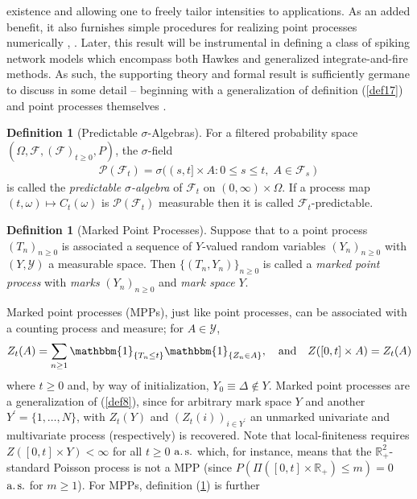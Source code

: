 \documentclass[12pt, oneside]{report}
\newcommand{\mbb}[1]{\mathbb{#1}}
\newcommand{\1}[1]{\mathbbm{1}_{\{#1\}}}
\newcommand{\mc}[1]{\mathcal{#1}}
\theoremstyle{definition}
\newtheorem{definition}[theorem]{Definition}
\begin{document}
existence and allowing one to freely tailor intensities to applications. As an
added benefit, it also furnishes simple procedures for realizing point processes
numerically \cite[algorithm 2]{Ogata_1981}, \cite{Mascart_Muzy_Reynaud-bouret_2021}.
Later, this result will be instrumental in defining a class of spiking network models which
encompass both Hawkes and generalized integrate-and-fire methods. As such, the
supporting theory and formal result is sufficiently germane to discuss in some
detail -- beginning with a generalization of definition (\ref{def17}) and point
processes themselves \cite[ch.8]{Bremaud_1981}.
\begin{definition}[Predictable $\sigma$-Algebras]\label{def18} For a filtered
    probability space $(\Omega,\mc{F},(\mc{F})_{t\geq 0},P)$, the $\sigma$-field
\begin{align}
    \mc{P}(\mc{F}_t)=\sigma((s,t]\times A:0\leq s\leq t,\;A\in\mc{F}_s)
\end{align}
is called the {\it predictable $\sigma$-algebra} of $\mc{F}_t$ on
$(0,\infty)\times\Omega$. If a process map $(t,\omega)\mapsto C_t(\omega)$ is
$\mc{P}(\mc{F}_t)$ measurable then it is called $\mc{F}_t$-predictable.
\end{definition}
\begin{definition}[Marked Point Processes]\label{def19} Suppose that to a point
    process $(T_n)_{n\geq 0}$ is associated a sequence of $Y$-valued random
    variables $(Y_n)_{n\geq 0}$ with $(Y,\mc{Y})$ a measurable space. Then
    $\{(T_n,Y_n)\}_{n\geq 0}$ is called a {\it marked point process} with {\it
    marks} $(Y_n)_{n\geq 0}$ and {\it mark space} $Y$.
\end{definition}
Marked point processes (MPPs), just like point processes, can be associated with
a counting process and measure; for $A\in\mc{Y}$,
\begin{align}
    Z_t(A)=\sum_{n\geq 1}\1{T_n\leq t}\1{Z_n\in A},\quad\text{and}\quad Z([0,t]\times A)=Z_t(A)
\end{align}
where $t\geq0$ and, by way of initialization, $Y_0\equiv\Delta\notin Y$. Marked
point processes are a generalization of (\ref{def8}), since for arbitrary mark
space $Y$ and another $Y^\prime=\{1,\dots,N\}$, with $Z_t(Y)$ and
$(Z_t(i))_{i\in Y^\prime}$ an unmarked univariate and multivariate process
(respectively) is recovered. Note that local-finiteness requires $Z([0,t]\times Y)<\infty$ for all $t\geq 0$ $\operatorname{a.s.}$ which,
for instance, means that the $\mbb{R}^2_+$-standard Poisson process is not a MPP (since $P(\Pi([0,t]\times\mbb{R}_+)\leq m)=0$ $\operatorname{a.s.}$ for $m\geq 1$). For MPPs, definition (\ref{def18}) is further
\end{document}
